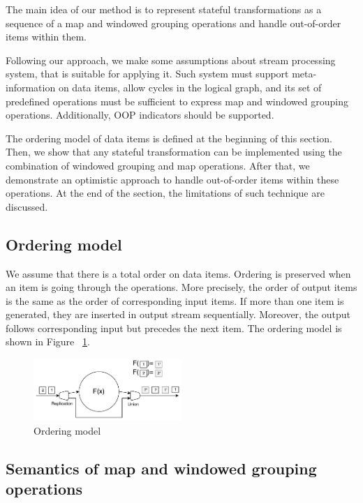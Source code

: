 
\label {fs-optimistic}

The main idea of our method is to represent stateful transformations as a sequence of a map and windowed grouping operations and handle out-of-order items within them. 

Following our approach, we make some assumptions about stream processing system, that is suitable for applying it. Such system must support meta-information on data items, allow cycles in the logical graph, and its set of predefined operations must be sufficient to express map and windowed grouping operations. Additionally, OOP indicators should be supported.

The ordering model of data items is defined at the beginning of this section. Then, we show that any stateful transformation can be implemented using the combination of windowed grouping and map operations. After that, we demonstrate an optimistic approach to handle out-of-order items within these operations. At the end of the section, the limitations of such technique are discussed.

\subsection{Ordering model}
We assume that there is a total order on data items. Ordering is preserved when an item is going through the operations. More precisely, the order of output items is the same as the order of corresponding input items. If more than one item is generated, they are inserted in output stream sequentially. Moreover, the output follows corresponding input but precedes the next item. The ordering model is shown in Figure ~\ref{ordering}.


\begin{figure}[htbp]
  \centering
  \includegraphics[width=0.5\textwidth]{pics/ordering}
  \caption{Ordering model}
  \label {ordering}
\end{figure}

\subsection{Semantics of map and windowed grouping operations}

